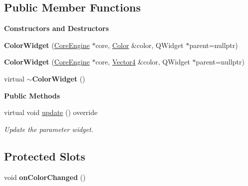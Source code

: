 \subsection*{Public Member Functions}
\begin{Indent}\textbf{ Constructors and Destructors}\par
\begin{DoxyCompactItemize}
\item 
\mbox{\label{classrev_1_1_view_1_1_color_widget_a83c91556ac8cba1def892ceb0ee0866e}} 
{\bfseries Color\+Widget} (\mbox{\hyperlink{classrev_1_1_core_engine}{Core\+Engine}} $\ast$core, \mbox{\hyperlink{classrev_1_1_color}{Color}} \&color, Q\+Widget $\ast$parent=nullptr)
\item 
\mbox{\label{classrev_1_1_view_1_1_color_widget_a66bb9f1559e806cfef41b4153ba1cf13}} 
{\bfseries Color\+Widget} (\mbox{\hyperlink{classrev_1_1_core_engine}{Core\+Engine}} $\ast$core, \mbox{\hyperlink{classrev_1_1_vector}{Vector4}} \&color, Q\+Widget $\ast$parent=nullptr)
\item 
\mbox{\label{classrev_1_1_view_1_1_color_widget_aae7d89c4043364ec3ad4ab7359fd156c}} 
virtual {\bfseries $\sim$\+Color\+Widget} ()
\end{DoxyCompactItemize}
\end{Indent}
\begin{Indent}\textbf{ Public Methods}\par
\begin{DoxyCompactItemize}
\item 
\mbox{\label{classrev_1_1_view_1_1_color_widget_aaa7d4badff69dad1e82915d4cfdc560d}} 
virtual void \mbox{\hyperlink{classrev_1_1_view_1_1_color_widget_aaa7d4badff69dad1e82915d4cfdc560d}{update}} () override
\begin{DoxyCompactList}\small\item\em Update the parameter widget. \end{DoxyCompactList}\end{DoxyCompactItemize}
\end{Indent}
\subsection*{Protected Slots}
\begin{DoxyCompactItemize}
\item 
\mbox{\label{classrev_1_1_view_1_1_color_widget_aac2c70deca05525b8a7f6186ee6d81bb}} 
void {\bfseries on\+Color\+Changed} ()
\end{DoxyCompactItemize}
